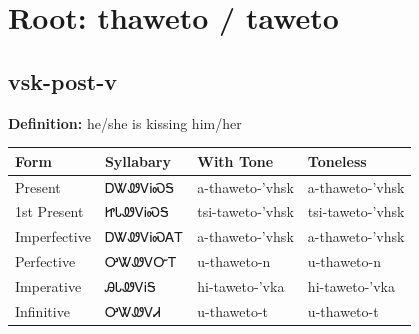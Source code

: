 \documentclass{article}%
\begin{document}
%
\normalsize%
\section*{Root: thaweto / taweto}%
\subsection*{vsk-post-v}%
\textbf{Definition: }%
he/she is kissing him/her%
\\[0.5em]%
\begin{tabular}{|l|l|l|l|}%
\hline%
\textbf{Form}&\textbf{Syllabary}&\textbf{With Tone}&\textbf{Toneless}\\%
\hline%
Present&ᎠᏔᏪᏙᎥᏍᎦ&a{-}thaweto{-}'vhsk&a{-}thaweto{-}'vhsk\\%
1st Present&ᏥᏓᏪᏙᎥᏍᎦ&tsi{-}taweto{-}'vhsk&tsi{-}taweto{-}'vhsk\\%
Imperfective&ᎠᏔᏪᏙᎥᏍᎪᎢ&a{-}thaweto{-}'vhsk&a{-}thaweto{-}'vhsk\\%
Perfective&ᎤᏔᏪᏙᏅᎢ&u{-}thaweto{-}n&u{-}thaweto{-}n\\%
Imperative&ᎯᏓᏪᏙᎥᎦ&hi{-}taweto{-}'vka&hi{-}taweto{-}'vka\\%
Infinitive&ᎤᏔᏪᏙᏗ&u{-}thaweto{-}t&u{-}thaweto{-}t\\%
\hline%
\end{tabular}%
\\[1em]%
\end{document}
